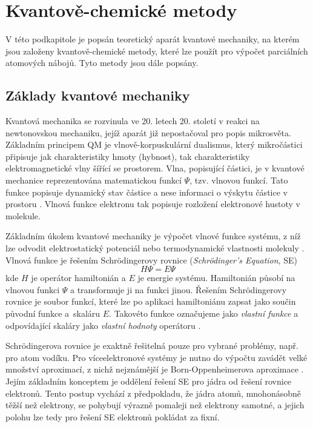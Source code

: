 \section{Kvantově-chemické metody}
V této podkapitole je popsán teoretický aparát kvantové mechaniky, na kterém jsou založeny kvantově-chemické metody, které lze použít pro výpočet parciálních atomových nábojů. Tyto metody jsou dále popsány. 

\subsection{Základy kvantové mechaniky}
Kvantová mechanika se rozvinula ve 20. letech 20. století v reakci na newtonovskou mechaniku, jejíž aparát již nepostačoval pro popis mikrosvěta.  Základním principem QM je vlnově-korpuskulární dualismus, který mikročástici připisuje jak charakteristiky hmoty (hybnost), tak charakteristiky elektromagnetické vlny šířící se prostorem.
Vlna, popisující částici, je v kvantové mechanice reprezentována matematickou funkcí $\Psi$, tzv. vlnovou funkcí. Tato funkce popisuje dynamický stav částice a nese informaci o výskytu částice v prostoru \cite{Cely}. Vlnová funkce elektronu tak popisuje rozložení elektronové hustoty v molekule. 

Základním úkolem kvantové mechaniky je výpočet vlnové funkce systému, z níž lze odvodit elektrostatický potenciál \cite{elstat_pot} nebo termodynamické vlastnosti molekuly \cite{td}. Vlnová funkce je řešením Schrödingerovy rovnice (\textit{Schrödinger's Equation}, SE)
\begin{equation}
    H\Psi = E\Psi
\end{equation}
kde $H$ je operátor hamiltonián a $E$ je energie systému. Hamiltonián působí na vlnovou funkci $\Psi$ a transformuje ji na funkci jinou. Řešením Schrödingerovy rovnice je soubor funkcí, které lze po aplikaci hamiltoniánu zapsat jako součin původní funkce a~skaláru $E$. Takovéto funkce označujeme jako \textit{vlastní funkce} a odpovídající skaláry jako \textit{vlastní hodnoty} operátoru \cite{Volatron}. 
 
 Schrödingerova rovnice je exaktně řešitelná pouze pro vybrané problémy, např. pro atom vodíku. Pro víceelektronové systémy je nutno do výpočtu zavádět velké množství aproximací, z nichž nejznámější je Born-Oppenheimerova aproximace \cite{BO_approx_Pilar}.
 Jejím základním konceptem je oddělení řešení SE pro jádra od řešení rovnice elektronů. Tento postup vychází z předpokladu, že jádra atomů, mnohonásobně těžší než elektrony, se pohybují výrazně pomaleji než elektrony samotné, a jejich polohu lze tedy pro řešení SE elektronů pokládat za fixní. %
 
